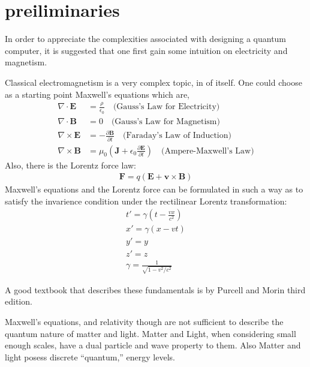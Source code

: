 \documentclass[]{article}
\begin{document}
\section{preiliminaries}
In order to appreciate the complexities associated with designing a quantum computer, it is suggested that one first gain some intuition on electricity and magnetism.
\par\noindent
Classical electromagnetism is a very complex topic, in of itself.  One could choose as a starting point Maxwell's equations which are,
\begin{align}
    \label{eq:gauss_law_e}
    \nabla \cdot \mathbf{E} &= \frac{\rho}{\epsilon_0} \quad \text{(Gauss's Law for Electricity)} \\
    \label{eq:gauss_law_m}
    \nabla \cdot \mathbf{B} &= 0 \quad \text{(Gauss's Law for Magnetism)} \\
    \label{eq:faraday_law}
    \nabla \times \mathbf{E} &= -\frac{\partial \mathbf{B}}{\partial t} \quad \text{(Faraday's Law of Induction)} \\
    \label{eq:ampere_maxwell_law}
    \nabla \times \mathbf{B} &= \mu_0 \left( \mathbf{J} + \epsilon_0 \frac{\partial \mathbf{E}}{\partial t} \right) \quad \text{(Ampere-Maxwell's Law)}
\end{align}
Also, there is the Lorentz force law:
\begin{eqnarray*}
\textbf{F} = q(\textbf{E} + \textbf{v} \times \textbf{B})
\end{eqnarray*}
Maxwell's equations and the Lorentz force can be formulated in such a way as to satisfy the invarience condition under the rectilinear Lorentz transformation:
\begin{eqnarray*}
t'=\gamma(t-\frac{vx}{c^{2}}) \\
x'=\gamma(x-vt) \\
y'=y \\
z'=z \\
\gamma=\frac{1}{\sqrt{1-v^{2}/c^{2}}}
\end{eqnarray*}
\par\noindent
A good textbook that describes these fundamentals is by Purcell and Morin third edition\cite{purcell2013electricity}.
\par\noindent
Maxwell's equations, and relativity though are not sufficient to describe the
quantum nature of matter and light.  Matter and Light, when considering
small enough scales, have a dual particle and wave property to them.  Also
Matter and light posess discrete ``quantum,'' energy levels.
\end{document}
